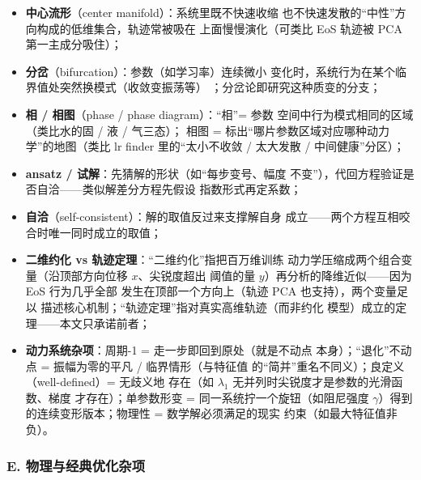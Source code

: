 \begin{itemize}
        映射下进入后就不再离开的点集——这里就是
        $x\in\{\pm x^{*}\}$ 两个点来回跳的集合。``图''是动力系统
        对``由状态参数化的集合''的称呼，与神经网络计算图无关；
  \item \textbf{中心流形}（center manifold）：系统里既不快速收缩
        也不快速发散的``中性''方向构成的低维集合，轨迹常被吸在
        上面慢慢演化（可类比 EoS 轨迹被 PCA 第一主成分吸住）；
  \item \textbf{分岔}（bifurcation）：参数（如学习率）连续微小
        变化时，系统行为在某个临界值处突然换模式（收敛变振荡等）
        ；分岔论即研究这种质变的分支；
  \item \textbf{相 / 相图}（phase / phase diagram）：``相''= 参数
        空间中行为模式相同的区域（类比水的固 / 液 / 气三态）；
        相图 = 标出``哪片参数区域对应哪种动力学''的地图（类比 lr
        finder 里的``太小不收敛 / 太大发散 / 中间健康''分区）；
  \item \textbf{ansatz / 试解}：先猜解的形状（如``每步变号、幅度
        不变''），代回方程验证是否自洽——类似解差分方程先假设
        指数形式再定系数；
  \item \textbf{自洽}（self-consistent）：解的取值反过来支撑解自身
        成立——两个方程互相咬合时唯一同时成立的取值；
  \item \textbf{二维约化 vs 轨迹定理}：``二维约化''指把百万维训练
        动力学压缩成两个组合变量（沿顶部方向位移 $x$、尖锐度超出
        阈值的量 $y$）再分析的降维近似——因为 EoS 行为几乎全部
        发生在顶部一个方向上（轨迹 PCA 也支持），两个变量足以
        描述核心机制；``轨迹定理''指对真实高维轨迹（而非约化
        模型）成立的定理——本文只承诺前者；
  \item \textbf{动力系统杂项}：周期-1 = 走一步即回到原处（就是不动点
        本身）；``退化''不动点 = 振幅为零的平凡 / 临界情形（与特征值
        的``简并''重名不同义）；良定义（well-defined）= 无歧义地
        存在（如 $\lambda_1$ 无并列时尖锐度才是参数的光滑函数、梯度
        才存在）；单参数形变 = 同一系统拧一个旋钮（如阻尼强度
        $\gamma$）得到的连续变形版本；物理性 = 数学解必须满足的现实
        约束（如最大特征值非负）。
\end{itemize}

\subsubsection*{E. 物理与经典优化杂项}

